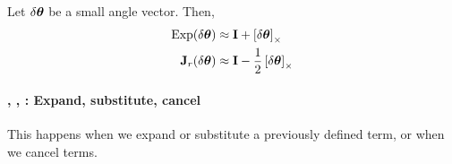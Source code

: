 Let ${\delta{{\bm \theta}}}$ be a small angle vector. Then,
%
\begin{align}
\operatorname*{Exp}({\delta{{\bm \theta}}}) &\approx {\bf I} + \left[{\delta{{\bm \theta}}}\right]_\times \\
{\bf J}_r({\delta{{\bm \theta}}}) &\approx {\bf I} - \frac12\left[{\delta{{\bm \theta}}}\right]_\times 
\end{align}

%


\paragraph{\cexpand, \csubst, \ccancel : Expand, substitute, cancel} This happens when we expand or substitute a previously defined term, or when we cancel terms.
%

%


